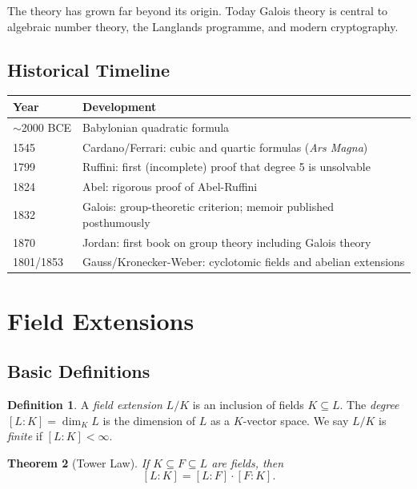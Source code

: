 \documentclass[12pt,a4paper]{amsart}
\newtheorem{theorem}{Theorem}[section]
\theoremstyle{definition}
\newtheorem{definition}[theorem]{Definition}
\begin{document}
The theory has grown far beyond its origin. Today Galois theory is central to
algebraic number theory, the Langlands programme, and modern cryptography.

\subsection*{Historical Timeline}

\begin{center}
\begin{tabular}{ll}
\toprule
Year & Development \\
\midrule
$\sim$2000 BCE & Babylonian quadratic formula \\
1545 & Cardano/Ferrari: cubic and quartic formulas (\emph{Ars Magna}) \\
1799 & Ruffini: first (incomplete) proof that degree 5 is unsolvable \\
1824 & Abel: rigorous proof of Abel-Ruffini \\
1832 & Galois: group-theoretic criterion; memoir published posthumously \\
1870 & Jordan: first book on group theory including Galois theory \\
1801/1853 & Gauss/Kronecker-Weber: cyclotomic fields and abelian extensions \\
\bottomrule
\end{tabular}
\end{center}

\section{Field Extensions}
\label{sec:fieldext}

\subsection{Basic Definitions}

\begin{definition}
A \emph{field extension} $L/K$ is an inclusion of fields $K \subseteq L$.
The \emph{degree} $[L:K] = \dim_K L$ is the dimension of $L$ as a
$K$-vector space. We say $L/K$ is \emph{finite} if $[L:K] < \infty$.
\end{definition}

\begin{theorem}[Tower Law]
If $K \subseteq F \subseteq L$ are fields, then
\[
  [L:K] = [L:F] \cdot [F:K].
\]
\end{theorem}
\end{document}
